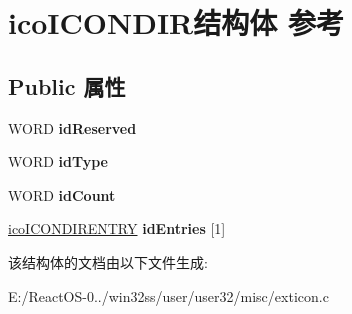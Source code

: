 \hypertarget{structico_i_c_o_n_d_i_r}{}\section{ico\+I\+C\+O\+N\+D\+I\+R结构体 参考}
\label{structico_i_c_o_n_d_i_r}
\subsection*{Public 属性}
\begin{DoxyCompactItemize}
\item 
\mbox{\label{structico_i_c_o_n_d_i_r_a4915b8dcdc453adb4e16b05b24f3bfab}} 
W\+O\+RD {\bfseries id\+Reserved}
\item 
\mbox{\label{structico_i_c_o_n_d_i_r_af7e9323901c9bbdfeb7a2195e543bd5a}} 
W\+O\+RD {\bfseries id\+Type}
\item 
\mbox{\label{structico_i_c_o_n_d_i_r_a16a1aa0a83a003a32030fa9e85dcec46}} 
W\+O\+RD {\bfseries id\+Count}
\item 
\mbox{\label{structico_i_c_o_n_d_i_r_ace233141747527533851081496eab884}} 
\hyperlink{structico_i_c_o_n_d_i_r_e_n_t_r_y}{ico\+I\+C\+O\+N\+D\+I\+R\+E\+N\+T\+RY} {\bfseries id\+Entries} \mbox{[}1\mbox{]}
\end{DoxyCompactItemize}


该结构体的文档由以下文件生成\+:\begin{DoxyCompactItemize}
\item 
E\+:/\+React\+O\+S-\/0../win32ss/user/user32/misc/exticon.\+c\end{DoxyCompactItemize}
